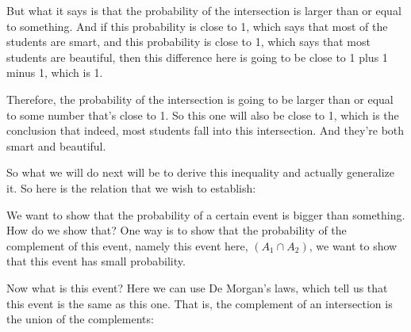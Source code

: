 \documentclass[pdftex, brazil, 12pt, twoside]{article}
\begin{document}
But what it says is that the probability of the
intersection is larger than or equal to something.
And if this probability is close to 1, which says that
most of the students are smart, and this probability is
close to 1, which says that most students are beautiful,
then this difference here is going to be close to 1 plus 1
minus 1, which is 1.

Therefore, the probability of the intersection is going to
be larger than or equal to some number that's close to 1.
So this one will also be close to 1, which is the conclusion
that indeed, most students fall into this intersection.
And they're both smart and beautiful.

So what we will do next will be to derive this inequality
and actually generalize it.
So here is the relation that we wish to establish:

\begin{figure}[H]
  \begin{center}
  \end{center}
\end{figure}

We want to show that the probability of a certain event
is bigger than something.
How do we show that?
One way is to show that the probability of the complement
of this event,
namely this event here, $(A_1 \cap A_2)$, we want to show that this event
has small probability.

Now what is this event?
Here we can use De Morgan's laws, which tell us that this
event is the same as this one.
That is, the complement of an intersection is the union of
the complements:

\begin{figure}[H]
  \begin{center}
  \end{center}
\end{figure}
\end{document}
